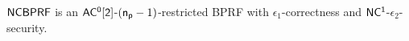 \begin{theorem}
\label{thm:rbprf-security}
	$\mathsf{NCBPRF}$ is an $\mathsf{AC^0[2]}$-$(\mathsf{n_p}-1)$-restricted BPRF with $\epsilon_1$-correctness and $\mathsf{NC^1}$-$\epsilon_2$-security.
\end{theorem}
